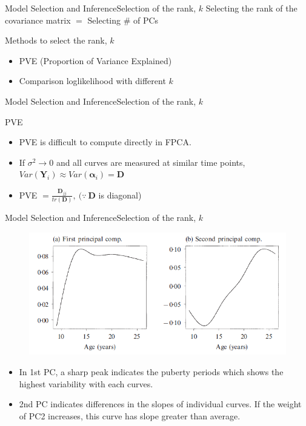 \documentclass{beamer}
\def \bY {\mathbf{Y}}
\def \balpha {\boldsymbol{\alpha}}
\begin{document}
\begin{frame}{Model Selection and Inference}{Selection of the rank, $k$}
	Selecting the rank of the covariance matrix $=$ Selecting \# of PCs
	\begin{block}{Methods to select the rank, $k$}
		\begin{itemize}
			\item {
				PVE (Proportion of Variance Explained)
			}
			\item {
				Comparison loglikelihood with different $k$
			}
		\end{itemize}
	\end{block}
\end{frame}

\begin{frame}{Model Selection and Inference}{Selection of the rank, $k$}
	\begin{block}{PVE}
		\begin{itemize}
			\item {
				PVE is difficult to compute directly in FPCA.
			}
			\item {
				If $\sigma^2 \rightarrow 0$ and all curves are measured at similar time points, $Var(\bY_i) \approx Var(\balpha_i) = \mathbf{D}$
			}
			\item {
				PVE $= \frac{\mathbf{D}_{jj}}{tr(\mathbf{D})}, \ (\because \ \mathbf{D} $ is diagonal)
			}
		\end{itemize}
	\end{block}
\end{frame}

\begin{frame}{Model Selection and Inference}{Selection of the rank, $k$}
	\begin{figure}[h] %
		\begin{center}
			\includegraphics[width=0.7\linewidth]{img/8.png}
		\end{center}
		\label{fig:long}
		\label{fig:onecol}
	\end{figure}
	\begin{itemize}
		\item {
			In 1st PC, a sharp peak indicates the puberty periods which shows the highest variability with each curves. 
		}
		\item {
			2nd PC indicates differences in the slopes of individual curves. If the weight of PC2 increases, this curve has slope greater than average.
		}
	\end{itemize}
\end{frame}
\end{document}
